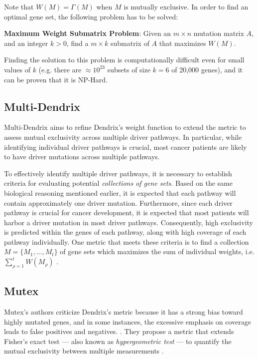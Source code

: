 Note that $W(M) = \Gamma(M)$ when $M$ is mutually exclusive. In order to find an optimal gene set, the following problem has to be solved:

\begin{displayquote}\label{mwsp}
    \textbf{Maximum Weight Submatrix Problem}: Given an $m \times n$ mutation matrix $A$, and an integer $k > 0$, find a $m \times k$ submatrix of $A$ that maximizes $W(M)$.
\end{displayquote}

Finding the solution to this problem is computationally difficult even for small values of $k$ (e.g. there are $\approx 10^{23}$ subsets of size $k = 6$ of 20,000 genes), and it can be proven that it is NP-Hard. 

\subsection{Multi-Dendrix} \label{multi_dendrix_2nd_chap}

Multi-Dendrix aims to refine Dendrix's weight function to extend the metric to assess mutual exclusivity across multiple driver pathways. In particular, while identifying individual driver pathways is crucial, most cancer patients are likely to have driver mutations across multiple pathways.

To effectively identify multiple driver pathways, it is necessary to establish criteria for evaluating potential \textit{collections of gene sets}. Based on the same biological reasoning mentioned earlier, it is expected that each pathway will contain approximately one driver mutation. Furthermore, since each driver pathway is crucial for cancer development, it is expected that most patients will harbor a driver mutation in most driver pathways. Consequently, high exclusivity is predicted within the genes of each pathway, along with high coverage of each pathway individually. One metric that meets these criteria is to find a collection $M = \{M_1, \ldots, M_t\}$ of gene sets which maximizes the sum of individual weights, i.e. $\sum_{\rho = 1}^t {W(M_\rho)}$ \cite{multi-dendrix}.

\subsection{Mutex}

Mutex's authors  criticize Dendrix's metric because it has a strong bias toward highly mutated genes, and in some instances, the excessive emphasis on coverage leads to false positives and negatives. . They propose a metric that extends Fisher's exact test --- also known as \textit{hypergeometric test} --- to quantify the mutual exclusivity between multiple measurements \cite{mutex}.

